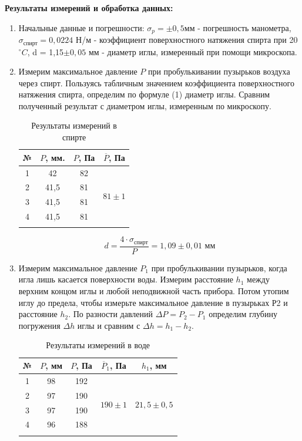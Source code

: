 \documentclass[a4paper, 12pt]{article}%
\begin{document}
		\textbf{Результаты измерений и обработка данных: }\\
	\begin{enumerate}
	\item Начальные данные и погрешности: $\sigma_p = \pm 0,5$мм - погрешность манометра, $\sigma_{\text{спирт}} = 0,0224$ Н/м - коэффициент поверхностного натяжения спирта при 20$^\circ C$, d = 1,15$\pm 0,05$ мм - диаметр иглы, измеренный при помощи микроскопа.
	
	
	\item Измерим максимальное давление $P$ при пробулькивании пузырьков воздуха через спирт. Пользуясь табличным значением коэффициента поверхностного натяжения спирта, определим по формуле (1) диаметр иглы. Сравним полученный результат с диаметром иглы, измеренным по микроскопу.
	
	\begin{longtable} {|c|c|c|c|}
		\hline
		№ & $ P $, мм. &  $ P $, Па  & $ \overline P  $, Па    \\ \hline
		1 & 42  & 82 & \multirow{5}{*}{$81 \pm 1$}  \\ \cline{1-3}
		2 & 41,5  & 81 &     \\ \cline{1-3}
		3 & 41,5  & 81 &     \\ \cline{1-3}
		4 & 41,5  & 81 &   \\ \hline
		\caption{Результаты измерений в спирте}
	\end{longtable}
	
	$$ d = \frac{4 \cdot \sigma_{\text{спирт}}}{P} = 1,09 \pm 0,01 \text{ мм}$$
	
	
	
	\item Измерим максимальное давление $P_1$ при пробулькивании
	пузырьков, когда игла лишь касается поверхности воды. Измерим расстояние $h_1$
	между верхним концом иглы и любой неподвижной часть прибора. Потом утопим иглу до предела, чтобы измерьте максимальное давление в пузырьках Р2 и расстояние $h_2$. По разности давлений $\Delta P = P_2 - P_1$ определим глубину погружения $\Delta h$ иглы и сравним с $\Delta h = h_1- h_2$.
	
	\begin{longtable} {|c|c|c|c|c|}
		\hline
		№ & $ P $, мм &  $ P $, Па  & $ \overline P_1  $, Па  & $h_1$, мм             \\ \hline
		1 & 98  & 192 & \multirow{5}{*}{$190 \pm 1$} &\multirow{5}{*}{$21,5 \pm 0,5$} \\ \cline{1-3}
		2 & 97  & 190 &                     &             \\ \cline{1-3}
		3 & 97  & 190 &                     &                      \\ \cline{1-3}
		4 & 96  & 188 &                     &                      \\ \hline
		\caption{Результаты измерений в воде}
	\end{longtable}
	

\end{enumerate}
\end{document}
